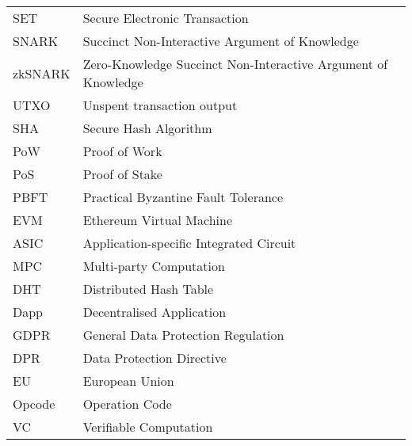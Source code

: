 
\abbreviations
\begin{center}
	\renewcommand{\arraystretch}{1.5}
	\begin{longtable}{ l @{\qquad} l }
	\toprule
	SET    & Secure Electronic Transaction \\
	SNARK & Succinct Non-Interactive Argument of Knowledge \\
	zkSNARK    & Zero-Knowledge Succinct Non-Interactive Argument of Knowledge \\
	UTXO    & Unspent transaction output \\
	SHA    & Secure Hash Algorithm \\
	PoW    & Proof of Work \\
	PoS    & Proof of Stake \\
	PBFT    & Practical Byzantine Fault Tolerance \\
	EVM    & Ethereum Virtual Machine \\
	ASIC    & Application-specific Integrated Circuit \\
	MPC    & Multi-party Computation \\
	DHT    & Distributed Hash Table \\
	Dapp    & Decentralised Application \\
	GDPR    & General Data Protection Regulation \\
	DPR    & Data Protection Directive \\
	EU    & European Union \\
	Opcode    & Operation Code \\
	VC    & Verifiable Computation \\
	\bottomrule
	\end{longtable}
\end{center}
